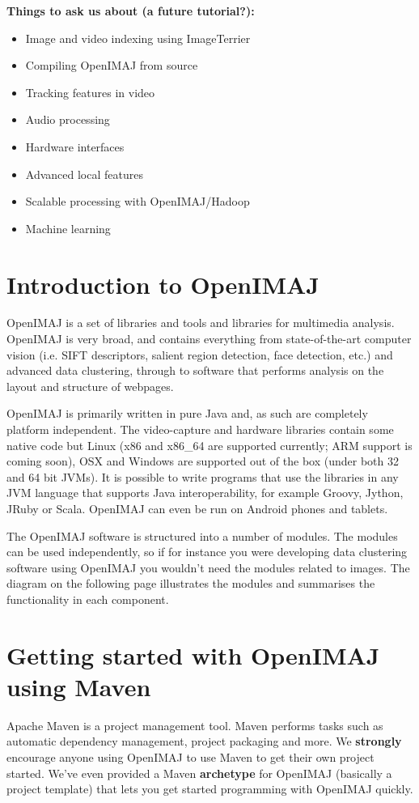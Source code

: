 \documentclass[10pt,a4paper,twoside,extrafontsizes]{memoir}
\begin{document}
\textbf{Things to ask us about (a future tutorial?):}
\begin{itemize}
	\item Image and video indexing using ImageTerrier
	\item Compiling OpenIMAJ from source
	\item Tracking features in video
	\item Audio processing
	\item Hardware interfaces
	\item Advanced local features
	\item Scalable processing with OpenIMAJ/Hadoop
	\item Machine learning
\end{itemize}

\chapter*{Introduction to OpenIMAJ}
OpenIMAJ is a set of libraries and tools and libraries for multimedia analysis. 
OpenIMAJ is very broad, and contains everything from state-of-the-art computer 
vision (i.e. SIFT descriptors, salient region detection, face detection, etc.) 
and advanced data clustering, through to software that performs analysis on the 
layout and structure of webpages.

OpenIMAJ is primarily written in pure Java and, as such are completely platform 
independent. The video-capture and hardware libraries contain some native code 
but Linux (x86 and x86\_64 are supported currently; ARM support is coming soon), 
OSX and Windows are supported out of the box (under both 32 and 64 bit JVMs). 
It is possible to write programs that use the libraries in any JVM language 
that supports Java interoperability, for example Groovy, Jython, JRuby or 
Scala. OpenIMAJ can even be run on Android phones and tablets.

The OpenIMAJ software is structured into a number of modules. The modules 
can be used independently, so if for instance you were developing data 
clustering software using OpenIMAJ you wouldn't need the modules related 
to images. The diagram on the following page illustrates the modules 
and summarises the functionality in each component.

\chapter{Getting started with OpenIMAJ using Maven}
\pagestyle{headings}
Apache Maven is a project management tool.  Maven performs tasks such 
as automatic  dependency management, project packaging and more. We \textbf{strongly} 
encourage anyone using OpenIMAJ to use Maven to get their own project started. 
We've even provided a Maven \textbf{archetype} for OpenIMAJ (basically a project template) 
that lets you get started programming with OpenIMAJ quickly. 
\end{document}
